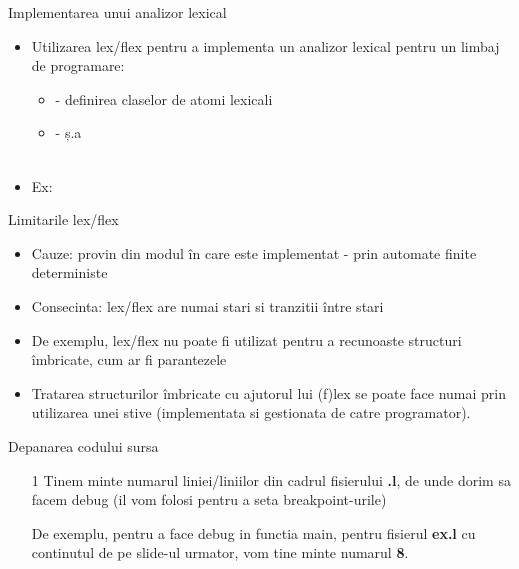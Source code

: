 \documentclass[pdf]{beamer}
\begin{document}
\begin{frame}{Implementarea unui analizor lexical}
\begin{itemize}
\item
Utilizarea lex/flex pentru a implementa un analizor lexical pentru un limbaj de programare:
\newline

\begin{itemize}
    \item 
    - definirea claselor de atomi lexicali
    \item
    - ș.a \\~\\
\end{itemize}
\item
Ex:

\end{itemize}
\end{frame}



\begin{frame}{Limitarile lex/flex}
\begin{itemize}
\item
Cauze: provin din modul în care este implementat - prin automate finite deterministe
\newline
\item
Consecinta: lex/flex are numai stari si tranzitii între stari
\newline
\item
De exemplu, lex/flex nu poate fi utilizat pentru a recunoaste structuri îmbricate, cum ar fi parantezele
\newline
\item
Tratarea structurilor îmbricate cu ajutorul lui (f)lex se poate face numai prin utilizarea unei stive (implementata si gestionata de catre programator).

\end{itemize}
\end{frame}



\begin{frame}{Depanarea codului sursa}
\begin{itemize}
\item[1]
Tinem minte numarul liniei/liniilor din cadrul fisierului \textbf{.l}, de unde dorim sa facem debug (il vom folosi pentru a seta breakpoint-urile)
\newline

De exemplu, pentru a face debug in functia main, pentru fisierul \textbf{ex.l} cu continutul de pe slide-ul urmator, vom tine minte numarul  \textbf{8}.
\end{itemize}
\end{frame}
\end{document}
